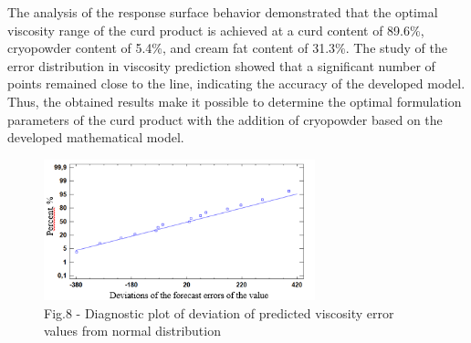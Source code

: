 \begin{multicols}{2}
The analysis of the response surface behavior demonstrated that the
optimal viscosity range of the curd product is achieved at a curd
content of 89.6\%, cryopowder content of 5.4\%, and cream fat content of
31.3\%. The study of the error distribution in viscosity prediction
showed that a significant number of points remained close to the line,
indicating the accuracy of the developed model. Thus, the obtained
results make it possible to determine the optimal formulation parameters
of the curd product with the addition of cryopowder based on the
developed mathematical model.
\end{multicols}

\begin{figure}[H]
	\centering
	\includegraphics[width=0.7\textwidth]{media/pish2/image88}
	\caption*{Fig.8 - Diagnostic plot of deviation of predicted viscosity
error values from normal distribution}
\end{figure}

